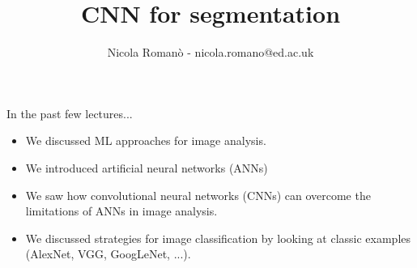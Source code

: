 \documentclass[9pt, aspectratio=169]{beamer}
\author{Nicola Roman\`o - nicola.romano@ed.ac.uk}
\title{CNN for segmentation}
\date{}
\begin{document}

\begin{frame}
    \titlepage
\end{frame}

\begin{frame}
    {In the past few lectures...}
    \begin{itemize}
        \item We discussed ML approaches for image analysis.
        \item We introduced artificial neural networks (ANNs)
        \item We saw how convolutional neural networks (CNNs) can overcome the limitations of ANNs in image analysis.
        \item We discussed strategies for image classification by looking at classic examples (AlexNet, VGG, GoogLeNet, ...).
    \end{itemize}
\end{frame}
\end{document}
